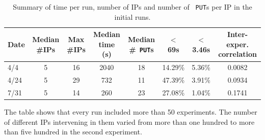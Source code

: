 \documentclass[letterpaper]{article}
\begin{document}
%
\begin{table}
\caption{Summary of time per run, number of IPs and number of {\tt
    PUT}s per IP in the initial runs. \label{tab:summary:os}}
\begin{center}
\begin{tabular}{l|ccccccc}
\hline
Date & Median \#IPs & Max \#IPs & Median time (s) & Median \#{\tt
  PUT}s & $<$ 69s & $<$ 3.46s & Inter-exper. correlation\\
\hline
4/4 & 5 & 16 & 2040 & 18 & 14.29\% & 5.36\% & 0.0082 \\
4/24 &  5 & 29 & 732 & 11 & 47.39\% & 3.91\% & 0.0934\\
7/31 & 5 & 14 & 260 & 23 & 27.08\% & 1.04\%  & 0.1741\\
\hline
\end{tabular}
\end{center}
\end{table}
%
The table shows that every run included more than 50 experiments. The
number of different IPs intervening in them varied from more than one
hundred to more than five hundred in the second experiment.
\end{document}
